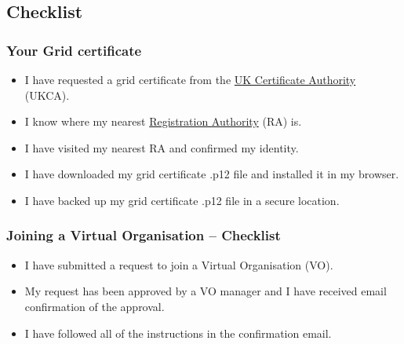 \subsection{Checklist}
\label{getting-on-the-grid---checklist}

\subsubsection{Your Grid certificate}\label{your-grid-certificate}

\begin{itemize}
\tightlist
\item
  I have requested a grid certificate from the
  \href{http://ngs.ac.uk/ukca}{UK Certificate Authority} (UKCA).
\item
  I know where my nearest
  \href{https://portal.ca.grid-support.ac.uk/caportal/pub/viewralist}{Registration
  Authority} (RA) is.
\item
  I have visited my nearest RA and confirmed my identity.
\item
  I have downloaded my grid certificate .p12 file and installed it in my
  browser.
\item
  I have backed up my grid certificate .p12 file in a secure location.
\end{itemize}

\subsubsection{Joining a Virtual Organisation -- Checklist}
\label{joining-a-virtual-organisation---checklist}

\begin{itemize}
\tightlist
\item
  I have submitted a request to join a Virtual Organisation (VO).
\item
  My request has been approved by a VO manager and I have received email
  confirmation of the approval.
\item
  I have followed all of the instructions in the confirmation email.
\end{itemize}

